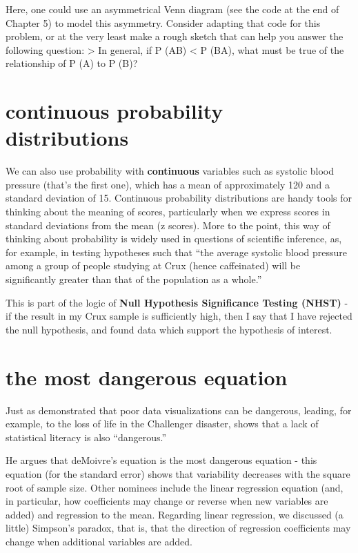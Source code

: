\documentclass[
  openany]{book}
\begin{document}
Here, one could use an asymmetrical Venn diagram (see the code at the end of Chapter 5) to model this asymmetry. Consider adapting that code for this problem, or at the very least make a rough sketch that can help you answer the following question:
\textgreater{} In general, if P (A\textbar B) \textless{} P (B\textbar A), what must be true of the relationship of P (A) to P (B)?

\hypertarget{continuous-probability-distributions}{%
\section{continuous probability distributions}\label{continuous-probability-distributions}}

We can also use probability with \textbf{continuous} variables such as systolic blood pressure (that's the first one), which has a mean of approximately 120 and a standard deviation of 15. Continuous probability distributions are handy tools for thinking about the meaning of scores, particularly when we express scores in standard deviations from the mean (z scores). More to the point, this way of thinking about probability is widely used in questions of scientific inference, as, for example, in testing hypotheses such that ``the average systolic blood pressure among a group of people studying at Crux (hence caffeinated) will be significantly greater than that of the population as a whole.''

This is part of the logic of \textbf{Null Hypothesis Significance Testing (NHST)} - if the result in my Crux sample is sufficiently high, then I say that I have rejected the null hypothesis, and found data which support the hypothesis of interest.

\hypertarget{the-most-dangerous-equation}{%
\section{the most dangerous equation}\label{the-most-dangerous-equation}}

Just as \citet{tufte2001visual} demonstrated that poor data visualizations can be dangerous, leading, for example, to the loss of life in the Challenger disaster, \citet{wainer2007dangerous} shows that a lack of statistical literacy is also ``dangerous.''

He argues that deMoivre's equation is the most dangerous equation - this equation (for the standard error) shows that variability decreases with the square root of sample size. Other nominees include the linear regression equation (and, in particular, how coefficients may change or reverse when new variables are added) and regression to the mean. Regarding linear regression, we discussed (a little) Simpson's paradox, that is, that the direction of regression coefficients may change when additional variables are added.
\end{document}
